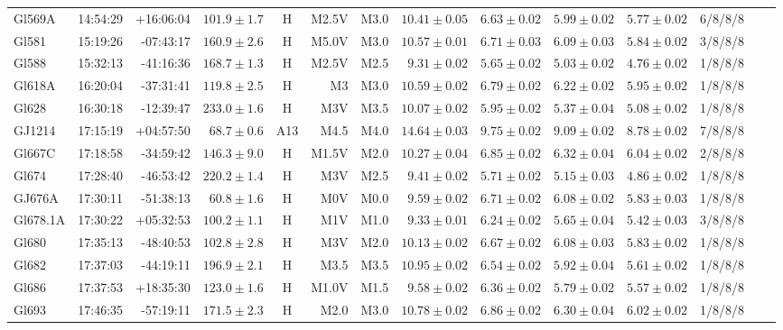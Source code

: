 \documentclass{aa}
\begin{document}
\begin{table}[h!]
{\begin{tabular}{ l r r r c r r r r r r r r r}
Gl569A & 14:54:29 & +16:06:04 & $101.9 \pm  1.7$ & H & M2.5V & M3.0 &  $10.41 \pm 0.05$ & $6.63 \pm 0.02$ & $5.99 \pm 0.02$ & $5.77 \pm 0.02$ & 6/8/8/8 \\
Gl581 & 15:19:26 & -07:43:17 & $160.9 \pm  2.6$ & H & M5.0V & M3.0 &  $10.57 \pm 0.01$ & $6.71 \pm 0.03$ & $6.09 \pm 0.03$ & $5.84 \pm 0.02$ & 3/8/8/8 \\
Gl588 & 15:32:13 & -41:16:36 & $168.7 \pm  1.3$ & H & M2.5V & M2.5 &  $9.31 \pm 0.02$ & $5.65 \pm 0.02$ & $5.03 \pm 0.02$ & $4.76 \pm 0.02$ & 1/8/8/8 \\
Gl618A & 16:20:04 & -37:31:41 & $119.8 \pm  2.5$ & H & M3 & M3.0 &  $10.59 \pm 0.02$ & $6.79 \pm 0.02$ & $6.22 \pm 0.02$ & $5.95 \pm 0.02$ & 1/8/8/8 \\
Gl628 & 16:30:18 & -12:39:47 & $233.0 \pm  1.6$ & H & M3V & M3.5 &  $10.07 \pm 0.02$ & $5.95 \pm 0.02$ & $5.37 \pm 0.04$ & $5.08 \pm 0.02$ & 1/8/8/8 \\
GJ1214 & 17:15:19 & +04:57:50 & $68.7 \pm  0.6$ & A13 & M4.5 & M4.0 &  $14.64 \pm 0.03$ & $9.75 \pm 0.02$ & $9.09 \pm 0.02$ & $8.78 \pm 0.02$ & 7/8/8/8 \\
Gl667C & 17:18:58 & -34:59:42 & $146.3 \pm  9.0$ & H & M1.5V & M2.0 &  $10.27 \pm 0.04$ & $6.85 \pm 0.02$ & $6.32 \pm 0.04$ & $6.04 \pm 0.02$ & 2/8/8/8 \\
Gl674 & 17:28:40 & -46:53:42 & $220.2 \pm  1.4$ & H & M3V & M2.5 &  $9.41 \pm 0.02$ & $5.71 \pm 0.02$ & $5.15 \pm 0.03$ & $4.86 \pm 0.02$ & 1/8/8/8 \\
GJ676A & 17:30:11 & -51:38:13 & $60.8 \pm  1.6$ & H & M0V & M0.0 &  $9.59 \pm 0.02$ & $6.71 \pm 0.02$ & $6.08 \pm 0.02$ & $5.83 \pm 0.03$ & 1/8/8/8 \\
Gl678.1A & 17:30:22 & +05:32:53 & $100.2 \pm  1.1$ & H & M1V & M1.0 &  $9.33 \pm 0.01$ & $6.24 \pm 0.02$ & $5.65 \pm 0.04$ & $5.42 \pm 0.03$ & 3/8/8/8 \\
Gl680 & 17:35:13 & -48:40:53 & $102.8 \pm  2.8$ & H & M3V & M2.0 &  $10.13 \pm 0.02$ & $6.67 \pm 0.02$ & $6.08 \pm 0.03$ & $5.83 \pm 0.02$ & 1/8/8/8 \\
Gl682 & 17:37:03 & -44:19:11 & $196.9 \pm  2.1$ & H & M3.5 & M3.5 &  $10.95 \pm 0.02$ & $6.54 \pm 0.02$ & $5.92 \pm 0.04$ & $5.61 \pm 0.02$ & 1/8/8/8 \\
Gl686 & 17:37:53 & +18:35:30 & $123.0 \pm  1.6$ & H & M1.0V & M1.5 &  $9.58 \pm 0.02$ & $6.36 \pm 0.02$ & $5.79 \pm 0.02$ & $5.57 \pm 0.02$ & 1/8/8/8 \\
Gl693 & 17:46:35 & -57:19:11 & $171.5 \pm  2.3$ & H & M2.0 & M3.0 &  $10.78 \pm 0.02$ & $6.86 \pm 0.02$ & $6.30 \pm 0.04$ & $6.02 \pm 0.02$ & 1/8/8/8 \\

\end{tabular}}
\end{table}
\end{document}
